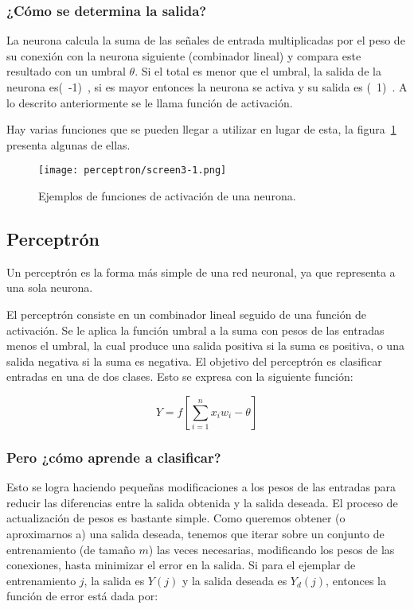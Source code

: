 \subsubsection{¿C\'omo se determina la salida?}

\noindent La neurona calcula la suma de las señales de entrada multiplicadas por el peso de su conexión con la neurona siguiente (combinador lineal) y compara este resultado con un umbral $\theta$. Si el total es menor que el umbral, la salida de la neurona es(\ -1)\ , si es mayor entonces la neurona se activa y su salida es (\ 1)\ . A lo descrito anteriormente se le llama función de activación.\par

Hay varias funciones que se pueden llegar a utilizar en lugar de esta, la figura~\ref{fig:screen3} presenta algunas de ellas.

\begin{figure}[h]
  \centering
  \texttt{[image: perceptron/screen3-1.png]}
  \caption{Ejemplos de funciones de activación de una neurona. \parencite[169]{Nengnevitsky2005}}
  \label{fig:screen3}
\end{figure}

\subsection{Perceptr\'on}

Un perceptrón es la forma más simple de una red neuronal, ya que representa a una sola neurona.

El perceptrón consiste en un combinador lineal seguido de una función de activación. Se le aplica la función umbral a la suma con pesos de las entradas menos el umbral, la cual produce una salida positiva si la suma es positiva, o una salida negativa si la suma es negativa. El objetivo del perceptrón es clasificar entradas en una de dos clases. Esto se expresa con la siguiente función: 

\[Y = f\left[\sum_{i=1}^{n}x_iw_i-\theta\right]\]
\parencite[169]{Nengnevitsky2005}

\subsubsection{Pero ¿c\'omo aprende a clasificar?}

Esto se logra haciendo pequeñas modificaciones a los pesos de las entradas para reducir las diferencias entre la salida obtenida y la salida deseada. El proceso de actualización de pesos es bastante simple. Como queremos obtener (o aproximarnos a) una salida deseada, tenemos que iterar sobre un conjunto de entrenamiento (de tamaño $m$) las veces necesarias, modificando los pesos de las conexiones, hasta minimizar el error en la salida. Si para el ejemplar de entrenamiento $j$, la salida es $Y(j)$ y la salida deseada es $Y_d(j)$, entonces la función de error está dada por:

